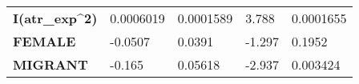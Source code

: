 \documentclass[]{article}
\begin{document}
\begin{longtable}[]{@{}lllll@{}}
\begin{minipage}[t]{0.23\columnwidth}
\textbf{I(atr\_exp\^{}2)}\strut
\end{minipage} & \begin{minipage}[t]{0.14\columnwidth}\raggedright
0.0006019\strut
\end{minipage} & \begin{minipage}[t]{0.16\columnwidth}\raggedright
0.0001589\strut
\end{minipage} & \begin{minipage}[t]{0.12\columnwidth}\raggedright
3.788\strut
\end{minipage} & \begin{minipage}[t]{0.14\columnwidth}\raggedright
0.0001655\strut
\end{minipage}\tabularnewline
\begin{minipage}[t]{0.23\columnwidth}\raggedright
\textbf{FEMALE}\strut
\end{minipage} & \begin{minipage}[t]{0.14\columnwidth}\raggedright
-0.0507\strut
\end{minipage} & \begin{minipage}[t]{0.16\columnwidth}\raggedright
0.0391\strut
\end{minipage} & \begin{minipage}[t]{0.12\columnwidth}\raggedright
-1.297\strut
\end{minipage} & \begin{minipage}[t]{0.14\columnwidth}\raggedright
0.1952\strut
\end{minipage}\tabularnewline
\begin{minipage}[t]{0.23\columnwidth}\raggedright
\textbf{MIGRANT}\strut
\end{minipage} & \begin{minipage}[t]{0.14\columnwidth}\raggedright
-0.165\strut
\end{minipage} & \begin{minipage}[t]{0.16\columnwidth}\raggedright
0.05618\strut
\end{minipage} & \begin{minipage}[t]{0.12\columnwidth}\raggedright
-2.937\strut
\end{minipage} & \begin{minipage}[t]{0.14\columnwidth}\raggedright
0.003424\strut
\end{minipage}\tabularnewline
\bottomrule
\end{longtable}
\end{document}
